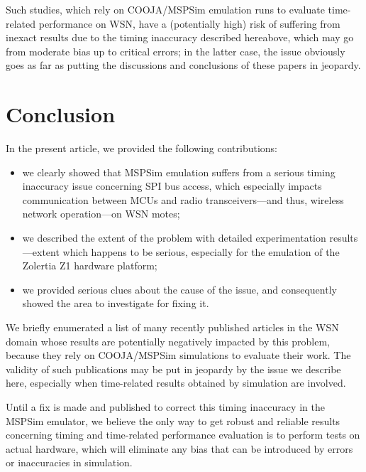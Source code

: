 \documentclass[10pt,final,journal,twocolumn]{IEEEtran}
\begin{document}
\medskip

Such studies, which rely on COOJA/MSPSim emulation runs to evaluate
time-related performance on WSN, have a (potentially high) risk of
suffering from inexact results due to the timing inaccuracy described
hereabove, which may go from moderate bias up to critical errors;
in the latter case, the issue obviously goes as far as putting
the discussions and conclusions of these papers in jeopardy.



\section{Conclusion}
\label{conclusion}

In the present article, we provided the following contributions:
\begin{itemize}
\item we clearly showed that MSPSim emulation suffers from a serious timing
inaccuracy issue concerning SPI bus access, which especially impacts
communication between MCUs and radio transceivers---and thus, wireless
network operation---on WSN motes;
\item we described the extent of the problem with detailed experimentation
results---extent which happens to be serious, especially for the emulation
of the Zolertia Z1 hardware platform;
\item we provided serious clues about the cause of the issue, and
consequently showed the area to investigate for fixing it.
\end{itemize}

We briefly enumerated a list of many recently published articles in the
WSN domain whose results are potentially negatively impacted by this problem,
because they rely on COOJA/MSPSim simulations to evaluate their work.
The validity of such publications may be put in jeopardy by the
issue we describe here, especially when time-related results
obtained by simulation are involved.

\medskip

Until a fix is made and published to correct this timing inaccuracy
in the MSPSim emulator, we believe the only way to get robust and reliable
results concerning timing and time-related performance evaluation is
to perform tests on actual hardware, which will eliminate any bias
that can be introduced by errors or inaccuracies in simulation.
\end{document}
